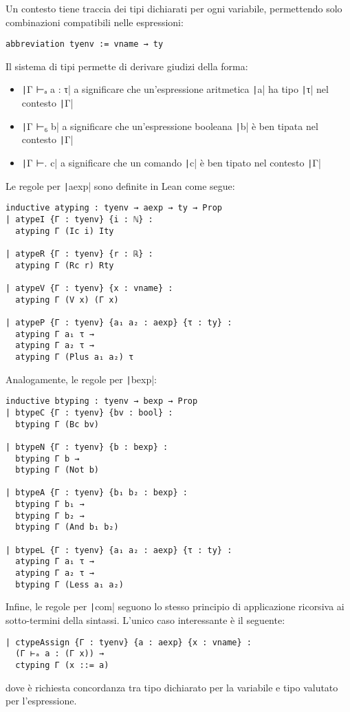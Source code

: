 Un contesto tiene traccia dei tipi dichiarati per ogni variabile, permettendo solo combinazioni compatibili nelle espressioni:
\begin{verbatim}
abbreviation tyenv := vname → ty
\end{verbatim}

Il sistema di tipi permette di derivare giudizi della forma:
\begin{itemize}
    \item \texttt|Γ ⊢ₐ a : τ| a significare che un'espressione aritmetica \texttt|a| ha tipo \texttt|τ| nel contesto \texttt|Γ|
    \item \texttt|Γ ⊢₆ b| a significare che un'espressione booleana \texttt|b| è ben tipata nel contesto \texttt|Γ|
    \item \texttt|Γ ⊢. c| a significare che un comando \texttt|c| è ben tipato nel contesto \texttt|Γ|
\end{itemize}
Le regole per \texttt|aexp| sono definite in Lean come segue:
\begin{verbatim}
inductive atyping : tyenv → aexp → ty → Prop
| atypeI {Γ : tyenv} {i : ℕ} :
  atyping Γ (Ic i) Ity

| atypeR {Γ : tyenv} {r : ℝ} :
  atyping Γ (Rc r) Rty

| atypeV {Γ : tyenv} {x : vname} :
  atyping Γ (V x) (Γ x)

| atypeP {Γ : tyenv} {a₁ a₂ : aexp} {τ : ty} :
  atyping Γ a₁ τ →
  atyping Γ a₂ τ →
  atyping Γ (Plus a₁ a₂) τ
\end{verbatim}
Analogamente, le regole per \texttt|bexp|:
\begin{verbatim}
inductive btyping : tyenv → bexp → Prop
| btypeC {Γ : tyenv} {bv : bool} :
  btyping Γ (Bc bv)

| btypeN {Γ : tyenv} {b : bexp} :
  btyping Γ b →
  btyping Γ (Not b)

| btypeA {Γ : tyenv} {b₁ b₂ : bexp} :
  btyping Γ b₁ →
  btyping Γ b₂ →
  btyping Γ (And b₁ b₂)

| btypeL {Γ : tyenv} {a₁ a₂ : aexp} {τ : ty} :
  atyping Γ a₁ τ →
  atyping Γ a₂ τ →
  btyping Γ (Less a₁ a₂)
\end{verbatim}
Infine, le regole per \texttt|com| seguono lo stesso principio di applicazione ricorsiva ai sotto-termini della sintassi. L'unico caso interessante è il seguente:
\begin{verbatim}
| ctypeAssign {Γ : tyenv} {a : aexp} {x : vname} :
  (Γ ⊢ₐ a : (Γ x)) →
  ctyping Γ (x ::= a)
\end{verbatim}
dove è richiesta concordanza tra tipo dichiarato per la variabile e tipo valutato per l'espressione.
